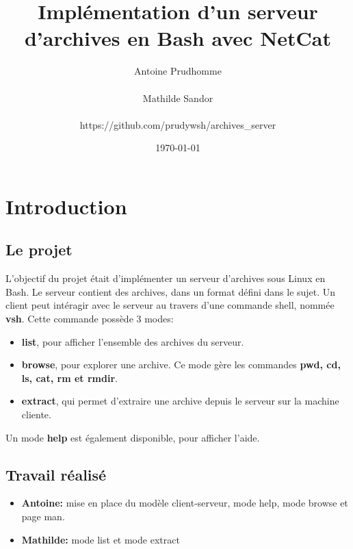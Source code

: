 \documentclass[titlepage]{article}
\begin{document}
	\title{Implémentation d'un serveur d'archives en Bash avec NetCat}
	\author{Antoine Prudhomme \\ \\ Mathilde Sandor \\ \\ https://github.com/prudywsh/archives\_server}
	\date{\today}

	\maketitle

	\tableofcontents
	\newpage

	\section{Introduction}
	
	\subsection{Le projet}
	L'objectif du projet était d'implémenter un serveur d'archives sous Linux en Bash.
	Le serveur contient des archives, dans un format défini dans le sujet. 
	Un client peut intéragir avec le serveur au travers d'une commande shell, nommée \textbf{vsh}.
	Cette commande possède 3 modes:
	\begin{itemize}  
	\item \textbf{list}, pour afficher l'ensemble des archives du serveur.
	\item \textbf{browse}, pour explorer une archive. Ce mode gère les commandes \textbf{pwd, cd, ls, cat, rm et rmdir}.
	\item \textbf{extract}, qui permet d'extraire une archive depuis le serveur sur la machine cliente.
	\end{itemize}

	Un mode \textbf{help} est également disponible, pour afficher l'aide.

	\subsection{Travail réalisé}

	\begin{itemize}  
	\item \textbf{Antoine: } mise en place du modèle client-serveur, mode help, mode browse et page man.
	\item \textbf{Mathilde: } mode list et mode extract
	\end{itemize}  
\end{document}
